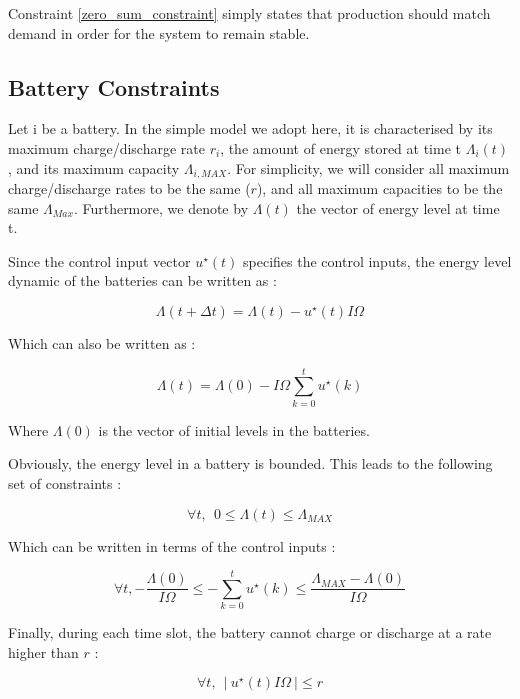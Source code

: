 \documentclass[conference]{IEEEtran}
\begin{document}
Constraint \ref{zero_sum_constraint} simply states that production should match demand in order for the system to remain stable.


\subsection{Battery Constraints}

Let i be a battery. In the simple model we adopt here, it is characterised by its maximum charge/discharge rate $r_i$, the amount of energy stored at time t $ \Lambda_i(t) $, and its maximum capacity $ \Lambda_{i, MAX} $. For simplicity, we will consider all maximum charge/discharge rates to be the same ($r$), and all maximum capacities to be the same $\Lambda_{Max}$. Furthermore, we denote by $ \Lambda(t) $ the vector of energy level at time t.

Since the control input vector $ u^{\star}(t) $ specifies the control inputs, the energy level dynamic of the batteries can be written as :

\begin{equation}
\Lambda(t+\Delta t) = \Lambda(t) - u^{\star}(t) I \Omega 
\end{equation}

Which can also be written as :

\begin{equation}
\Lambda(t)  = \Lambda(0) - I \Omega \sum_{k=0}^{t}u^{\star}(k)
\end{equation}

Where $ \Lambda(0) $ is the vector of initial levels in the batteries.

Obviously, the energy level in a battery is bounded. This leads to the following set of constraints : 

\begin{equation}
 \forall t, \ \ 0 \leq \Lambda(t) \leq \Lambda_{MAX}
\end{equation}
 
Which can be written in terms of the control inputs :

\begin{equation}
\label{level_constraints}
\forall t,-\frac{\Lambda(0)}{I \Omega} \leq -\sum_{k=0}^{t}u^{\star}(k) \leq \frac{ \Lambda_{MAX} - \Lambda(0)}{I \Omega}
\end{equation}

Finally, during each time slot, the battery cannot charge or discharge at a rate higher than $ r $ : 

\begin{equation}
\label{rate_constraints}
 \forall t,\ \ \left|\ u^{\star}(t)I \Omega\ \right| \leq r 
 \end{equation}
\end{document}
